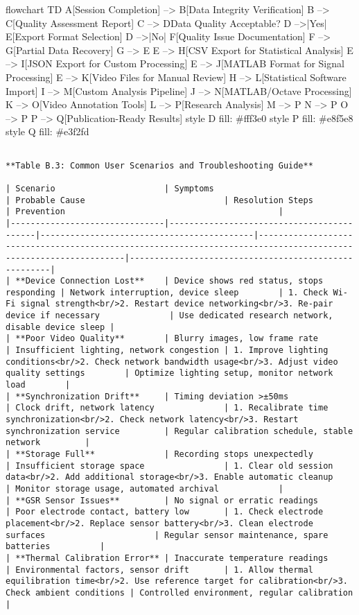 \documentclass[12pt,a4paper]{report}
\begin{document}
flowchart TD
    A[Session Completion] --> B[Data Integrity Verification]
    B --> C[Quality Assessment Report]
    C --> D{Data Quality Acceptable?}
    D -->|Yes| E[Export Format Selection]
    D -->|No| F[Quality Issue Documentation]
    F --> G[Partial Data Recovery]
    G --> E
    E --> H[CSV Export for Statistical Analysis]
    E --> I[JSON Export for Custom Processing]
    E --> J[MATLAB Format for Signal Processing]
    E --> K[Video Files for Manual Review]
    H --> L[Statistical Software Import]
    I --> M[Custom Analysis Pipeline]
    J --> N[MATLAB/Octave Processing]
    K --> O[Video Annotation Tools]
    L --> P[Research Analysis]
    M --> P
    N --> P
    O --> P
    P --> Q[Publication-Ready Results]
    style D fill: \#fff3e0
    style P fill: \#e8f5e8
    style Q fill: \#e3f2fd
\begin{verbatim}

**Table B.3: Common User Scenarios and Troubleshooting Guide**

| Scenario                      | Symptoms                                  | Probable Cause                            | Resolution Steps                                                                                                | Prevention                                           |
|-------------------------------|-------------------------------------------|-------------------------------------------|-----------------------------------------------------------------------------------------------------------------|------------------------------------------------------|
| **Device Connection Lost**    | Device shows red status, stops responding | Network interruption, device sleep        | 1. Check Wi-Fi signal strength<br/>2. Restart device networking<br/>3. Re-pair device if necessary              | Use dedicated research network, disable device sleep |
| **Poor Video Quality**        | Blurry images, low frame rate             | Insufficient lighting, network congestion | 1. Improve lighting conditions<br/>2. Check network bandwidth usage<br/>3. Adjust video quality settings        | Optimize lighting setup, monitor network load        |
| **Synchronization Drift**     | Timing deviation >±50ms                   | Clock drift, network latency              | 1. Recalibrate time synchronization<br/>2. Check network latency<br/>3. Restart synchronization service         | Regular calibration schedule, stable network         |
| **Storage Full**              | Recording stops unexpectedly              | Insufficient storage space                | 1. Clear old session data<br/>2. Add additional storage<br/>3. Enable automatic cleanup                         | Monitor storage usage, automated archival            |
| **GSR Sensor Issues**         | No signal or erratic readings             | Poor electrode contact, battery low       | 1. Check electrode placement<br/>2. Replace sensor battery<br/>3. Clean electrode surfaces                      | Regular sensor maintenance, spare batteries          |
| **Thermal Calibration Error** | Inaccurate temperature readings           | Environmental factors, sensor drift       | 1. Allow thermal equilibration time<br/>2. Use reference target for calibration<br/>3. Check ambient conditions | Controlled environment, regular calibration          |


\end{verbatim}
\end{document}
